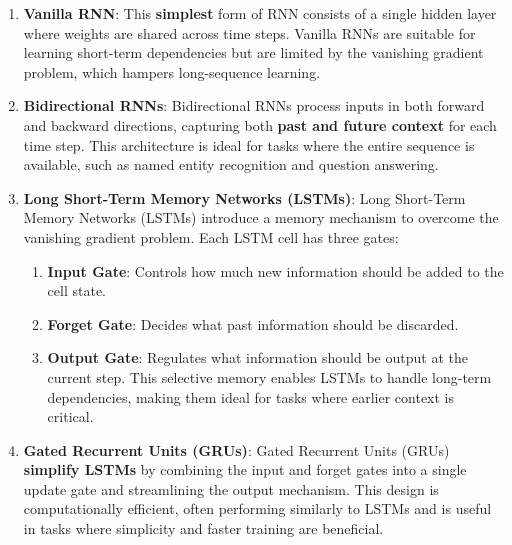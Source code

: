 \begin{enumerate}
    \item \textbf{Vanilla RNN}: This \textbf{simplest} form of RNN consists of a single hidden layer where weights are shared across time steps. 
    Vanilla RNNs are suitable for learning short-term dependencies but are limited by the vanishing gradient problem, which hampers long-sequence learning.
    \hfill \cite{geeksforgeeks/machine-learning/introduction-to-recurrent-neural-network}
    

    \item \textbf{Bidirectional RNNs}: Bidirectional RNNs process inputs in both forward and backward directions, capturing both \textbf{past and future context} for each time step. 
    This architecture is ideal for tasks where the entire sequence is available, such as named entity recognition and question answering.
    \hfill \cite{geeksforgeeks/machine-learning/introduction-to-recurrent-neural-network}

    \item \textbf{Long Short-Term Memory Networks (LSTMs)}: Long Short-Term Memory Networks (LSTMs) introduce a memory mechanism to overcome the vanishing gradient problem. 
    Each LSTM cell has three gates:
    \hfill \cite{geeksforgeeks/machine-learning/introduction-to-recurrent-neural-network}
    \begin{enumerate}
        \item \textbf{Input Gate}: Controls how much new information should be added to the cell state.
        \hfill \cite{geeksforgeeks/machine-learning/introduction-to-recurrent-neural-network}
    
        \item \textbf{Forget Gate}: Decides what past information should be discarded.
        \hfill \cite{geeksforgeeks/machine-learning/introduction-to-recurrent-neural-network}
    
        \item \textbf{Output Gate}: Regulates what information should be output at the current step. This selective memory enables LSTMs to handle long-term dependencies, making them ideal for tasks where earlier context is critical.
        \hfill \cite{geeksforgeeks/machine-learning/introduction-to-recurrent-neural-network}
    \end{enumerate}

    \item \textbf{Gated Recurrent Units (GRUs)}: Gated Recurrent Units (GRUs) \textbf{simplify LSTMs} by combining the input and forget gates into a single update gate and streamlining the output mechanism. 
    This design is computationally efficient, often performing similarly to LSTMs and is useful in tasks where simplicity and faster training are beneficial.
    \hfill \cite{geeksforgeeks/machine-learning/introduction-to-recurrent-neural-network}
\end{enumerate}



